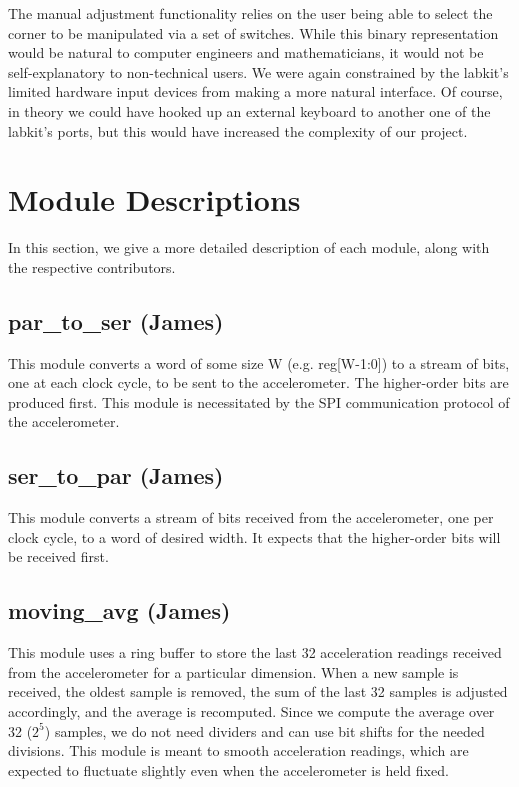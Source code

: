 \documentclass{article}
\begin{document}
The manual adjustment functionality relies on the user being able to select the corner to be manipulated via a set of switches.
While this binary representation would be natural to computer engineers and mathematicians, it would not be self-explanatory to non-technical users.
We were again constrained by the labkit's limited hardware input devices from making a more natural interface.
Of course, in theory we could have hooked up an external keyboard to another one of the labkit's ports,
but this would have increased the complexity of our project.

\section{Module Descriptions}

In this section, we give a more detailed description of each module, along with the respective contributors.

\subsection{par\_to\_ser (James)}
This module converts a word of some size W (e.g. reg[W-1:0]) to a stream of bits, one at each clock cycle, to be sent to the accelerometer.
The higher-order bits are produced first.
This module is necessitated by the SPI communication protocol of the accelerometer.

\subsection{ser\_to\_par (James)}
This module converts a stream of bits received from the accelerometer, one per clock cycle, to a word of desired width.
It expects that the higher-order bits will be received first.

\subsection{moving\_avg (James)}
This module uses a ring buffer to store the last 32 acceleration readings received from the accelerometer for a particular dimension.
When a new sample is received, the oldest sample is removed, the sum of the last 32 samples is adjusted accordingly, and the average is recomputed.
Since we compute the average over 32 ($2^5$) samples, we do not need dividers and can use bit shifts for the needed divisions.
This module is meant to smooth acceleration readings, which are expected to fluctuate slightly even when the accelerometer is held fixed.
\end{document}
